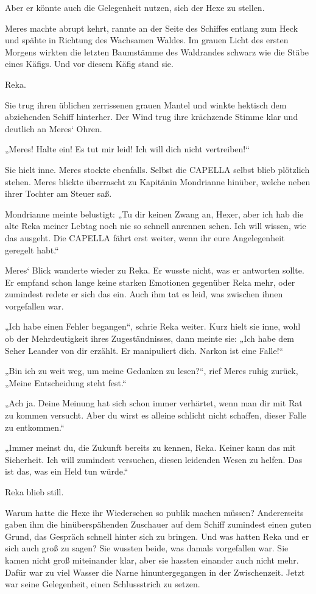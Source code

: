 Aber er könnte auch die Gelegenheit nutzen, sich der Hexe zu stellen.

Meres machte abrupt kehrt, rannte an der Seite des Schiffes entlang zum Heck und spähte in Richtung des Wachsamen Waldes. Im grauen Licht des ersten Morgens wirkten die letzten Baumstämme des Waldrandes schwarz wie die Stäbe eines Käfigs. Und vor diesem Käfig stand sie.

Reka.

Sie trug ihren üblichen zerrissenen grauen Mantel und winkte hektisch dem abziehenden Schiff hinterher. Der Wind trug ihre krächzende Stimme klar und deutlich an Meres‘ Ohren.

„Meres! Halte ein! Es tut mir leid! Ich will dich nicht vertreiben!“

Sie hielt inne. Meres stockte ebenfalls. Selbst die CAPELLA selbst blieb plötzlich stehen. Meres blickte überrascht zu Kapitänin Mondrianne hinüber, welche neben ihrer Tochter am Steuer saß.

Mondrianne meinte belustigt: „Tu dir keinen Zwang an, Hexer, aber ich hab die alte Reka meiner Lebtag noch nie so schnell anrennen sehen. Ich will wissen, wie das ausgeht. Die CAPELLA fährt erst weiter, wenn ihr eure Angelegenheit geregelt habt.“

Meres‘ Blick wanderte wieder zu Reka. Er wusste nicht, was er antworten sollte. Er empfand schon lange keine starken Emotionen gegenüber Reka mehr, oder zumindest redete er sich das ein. Auch ihm tat es leid, was zwischen ihnen vorgefallen war.

„Ich habe einen Fehler begangen“, schrie Reka weiter. Kurz hielt sie inne, wohl ob der Mehrdeutigkeit ihres Zugeständnisses, dann meinte sie: „Ich habe dem Seher Leander von dir erzählt. Er manipuliert dich. Narkon ist eine Falle!“

„Bin ich zu weit weg, um meine Gedanken zu lesen?“, rief Meres ruhig zurück, „Meine Entscheidung steht fest.“

„Ach ja. Deine Meinung hat sich schon immer verhärtet, wenn man dir mit Rat zu kommen versucht. Aber du wirst es alleine schlicht nicht schaffen, dieser Falle zu entkommen.“

„Immer meinst du, die Zukunft bereits zu kennen, Reka. Keiner kann das mit Sicherheit. Ich will zumindest versuchen, diesen leidenden Wesen zu helfen. Das ist das, was ein Held tun würde.“

Reka blieb still.

Warum hatte die Hexe ihr Wiedersehen so publik machen müssen? Andererseits gaben ihm die hinüberspähenden Zuschauer auf dem Schiff zumindest einen guten Grund, das Gespräch schnell hinter sich zu bringen. Und was hatten Reka und er sich auch groß zu sagen? Sie wussten beide, was damals vorgefallen war. Sie kamen nicht groß miteinander klar, aber sie hassten einander auch nicht mehr. Dafür war zu viel Wasser die Narne hinuntergegangen in der Zwischenzeit. Jetzt war seine Gelegenheit, einen Schlussstrich zu setzen.

